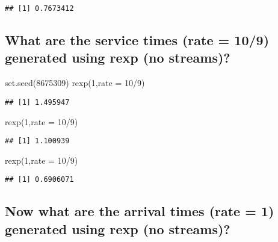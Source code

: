 \documentclass[
]{article}
\newenvironment{Shaded}{\begin{snugshade}}{\end{snugshade}}
\newcommand{\AttributeTok}[1]{\textcolor[rgb]{0.77,0.63,0.00}{#1}}
\newcommand{\DecValTok}[1]{\textcolor[rgb]{0.00,0.00,0.81}{#1}}
\newcommand{\FunctionTok}[1]{\textcolor[rgb]{0.00,0.00,0.00}{#1}}
\newcommand{\NormalTok}[1]{#1}
\newcommand{\SpecialCharTok}[1]{\textcolor[rgb]{0.00,0.00,0.00}{#1}}
\begin{document}
\begin{verbatim}
## [1] 0.7673412
\end{verbatim}

\hypertarget{what-are-the-service-times-rate-109-generated-using-rexp-no-streams}{%
\subsection{What are the service times (rate = 10/9) generated using
rexp (no
streams)?}\label{what-are-the-service-times-rate-109-generated-using-rexp-no-streams}}

\begin{Shaded}
\begin{Highlighting}[]
\FunctionTok{set.seed}\NormalTok{(}\DecValTok{8675309}\NormalTok{)}
\FunctionTok{rexp}\NormalTok{(}\DecValTok{1}\NormalTok{,}\AttributeTok{rate =} \DecValTok{10}\SpecialCharTok{/}\DecValTok{9}\NormalTok{)}
\end{Highlighting}
\end{Shaded}

\begin{verbatim}
## [1] 1.495947
\end{verbatim}

\begin{Shaded}
\begin{Highlighting}[]
\FunctionTok{rexp}\NormalTok{(}\DecValTok{1}\NormalTok{,}\AttributeTok{rate =} \DecValTok{10}\SpecialCharTok{/}\DecValTok{9}\NormalTok{)}
\end{Highlighting}
\end{Shaded}

\begin{verbatim}
## [1] 1.100939
\end{verbatim}

\begin{Shaded}
\begin{Highlighting}[]
\FunctionTok{rexp}\NormalTok{(}\DecValTok{1}\NormalTok{,}\AttributeTok{rate =} \DecValTok{10}\SpecialCharTok{/}\DecValTok{9}\NormalTok{)}
\end{Highlighting}
\end{Shaded}

\begin{verbatim}
## [1] 0.6906071
\end{verbatim}

\hypertarget{now-what-are-the-arrival-times-rate-1-generated-using-rexp-no-streams}{%
\subsection{Now what are the arrival times (rate = 1) generated using
rexp (no
streams)?}\label{now-what-are-the-arrival-times-rate-1-generated-using-rexp-no-streams}}
\end{document}
